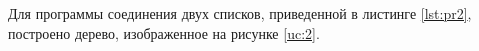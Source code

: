 \newpage
Для программы соединения двух списков, приведенной в листинге \ref{lst:pr2}, построено дерево, изображенное на рисунке \ref{uc:2}.

\begin{figure}[H]
\end{figure}
 
